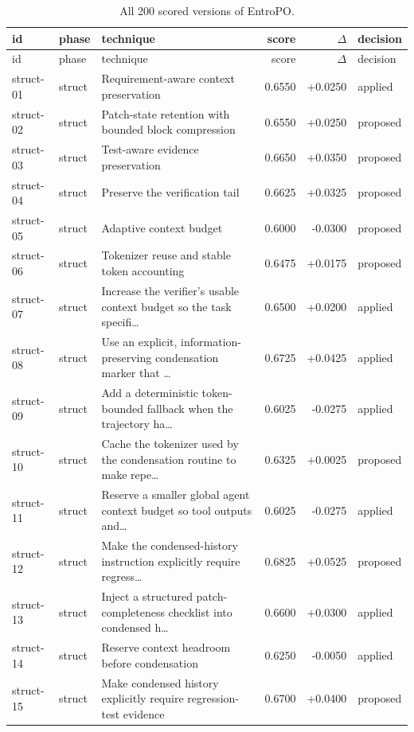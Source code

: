 \begin{center}\scriptsize\begin{longtable}{llp{5.2cm}rrl}
\caption{All 200 scored versions of EntroPO.}\\
\toprule id & phase & technique & score & $\Delta$ & decision \\ \midrule \endfirsthead
\toprule id & phase & technique & score & $\Delta$ & decision \\ \midrule \endhead
struct-01 & struct & Requirement-aware context preservation & 0.6550 & +0.0250 & applied \\
struct-02 & struct & Patch-state retention with bounded block compression & 0.6550 & +0.0250 & proposed \\
struct-03 & struct & Test-aware evidence preservation & 0.6650 & +0.0350 & proposed \\
struct-04 & struct & Preserve the verification tail & 0.6625 & +0.0325 & proposed \\
struct-05 & struct & Adaptive context budget & 0.6000 & -0.0300 & proposed \\
struct-06 & struct & Tokenizer reuse and stable token accounting & 0.6475 & +0.0175 & proposed \\
struct-07 & struct & Increase the verifier's usable context budget so the task specifi\ldots{} & 0.6500 & +0.0200 & applied \\
struct-08 & struct & Use an explicit, information-preserving condensation marker that \ldots{} & 0.6725 & +0.0425 & applied \\
struct-09 & struct & Add a deterministic token-bounded fallback when the trajectory ha\ldots{} & 0.6025 & -0.0275 & applied \\
struct-10 & struct & Cache the tokenizer used by the condensation routine to make repe\ldots{} & 0.6325 & +0.0025 & proposed \\
struct-11 & struct & Reserve a smaller global agent context budget so tool outputs and\ldots{} & 0.6025 & -0.0275 & applied \\
struct-12 & struct & Make the condensed-history instruction explicitly require regress\ldots{} & 0.6825 & +0.0525 & proposed \\
struct-13 & struct & Inject a structured patch-completeness checklist into condensed h\ldots{} & 0.6600 & +0.0300 & applied \\
struct-14 & struct & Reserve context headroom before condensation & 0.6250 & -0.0050 & applied \\
struct-15 & struct & Make condensed history explicitly require regression-test evidence & 0.6700 & +0.0400 & proposed \\

\end{longtable}
\end{center}
